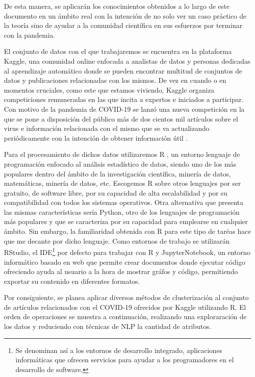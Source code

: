 \documentclass[10pt, a4paper]{article}
\begin{document}
De esta manera, se aplicarán los conocimientos obtenidos a lo largo de este documento en un ámbito real con la intención de no solo ver un caso práctico de la teoría sino de ayudar a la comunidad científica en sus esfuerzos por terminar con la pandemia.

El conjunto de datos con el que trabajaremos se encuentra en la plataforma Kaggle, una comunidad online enfocada a analistas de datos y personas dedicadas al aprendizaje automático donde se pueden encontrar multitud de conjuntos de datos y publicaciones relacionadas con los mismos. De vez en cuando o en momentos cruciales, como este que estamos viviendo, Kaggle organiza competiciones remuneradas en las que incita a expertos e iniciados a participar. Con motivo de la pandemia de COVID-19 se lanzó una nueva competición en la que se pone a disposición del público más de dos cientos mil artículos sobre el virus e información relacionada con el mismo que se va actualizando periódicamente con la intención de obtener información útil \cite{kaggle}.

Para el procesamiento de dichos datos utilizaremos R \cite{R}, un entorno lenguaje de programación enfocado al análisis estadístico de datos, siendo uno de los más populares dentro del ámbito de la investigación científica, minería de datos, matemáticas, minería de datos, etc. Escogemos R sobre otros lenguajes por ser gratuito, de software libre, por su capacidad de alta escalabilidad y por su compatibilidad con todos los sistemas operativos. Otra alternativa que presenta las mismas características sería Python, otro de los lenguajes de programación más populares y que se caracteriza por su capacidad para emplearse en cualquier ámbito. Sin embargo, la familiaridad obtenida con R para este tipo de taréas hace que me decante por dicho lenguaje. Como entornos de trabajo se utilizarán RStudio, el IDE\footnote{Se denominan así a los entornos de desarrollo integrado, aplicaciones informáticas que ofrecen servicios para ayudar a los programadores en el desarrollo de software.} por defecto para trabajar con R y JupyterNotebook, un entorno informático basado en web que permite crear documentos donde ejecutar código ofreciendo ayuda al usuario a la hora de mostrar gráfos y código, permitiendo exportar su contenido en diferentes formatos.

Por consiguiente, se planea aplicar diversos métodos de clusterización al conjunto de artículos relacionados con el COVID-19 ofrecidos por Kaggle utilizando R. El orden de operaciones se muestra a continuación, realizando una exploraración de los datos y reduciendo con técnicas de NLP la cantidad de atributos.
\end{document}
